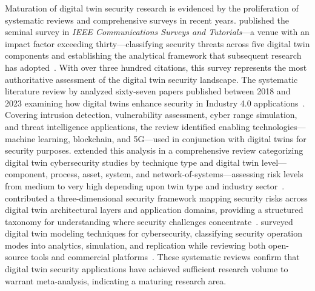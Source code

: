 Maturation of digital twin security research is evidenced by the proliferation of systematic reviews and comprehensive surveys in recent years. \citeauthor{Alcaraz_Lopez_2022} published the seminal survey in \textit{IEEE Communications Surveys and Tutorials}---a venue with an impact factor exceeding thirty---classifying security threats across five digital twin components and establishing the analytical framework that subsequent research has adopted~\parencite{Alcaraz_Lopez_2022}. With over three hundred citations, this survey represents the most authoritative assessment of the digital twin security landscape. The systematic literature review by \citeauthor{ElHajj_2024} analyzed sixty-seven papers published between 2018 and 2023 examining how digital twins enhance security in Industry 4.0 applications~\parencite{ElHajj_2024}. Covering intrusion detection, vulnerability assessment, cyber range simulation, and threat intelligence applications, the review identified enabling technologies---machine learning, blockchain, and 5G---used in conjunction with digital twins for security purposes. \citeauthor{Alhumam_2025} extended this analysis in a comprehensive review categorizing digital twin cybersecurity studies by technique type and digital twin level---component, process, asset, system, and network-of-systems---assessing risk levels from medium to very high depending upon twin type and industry sector~\parencite{Alhumam_2025}. \citeauthor{Jeremiah_2024} contributed a three-dimensional security framework mapping security risks across digital twin architectural layers and application domains, providing a structured taxonomy for understanding where security challenges concentrate~\parencite{Jeremiah_2024}. \citeauthor{Qureshi_2025} surveyed digital twin modeling techniques for cybersecurity, classifying security operation modes into analytics, simulation, and replication while reviewing both open-source tools and commercial platforms~\parencite{Qureshi_2025}. These systematic reviews confirm that digital twin security applications have achieved sufficient research volume to warrant meta-analysis, indicating a maturing research area.

